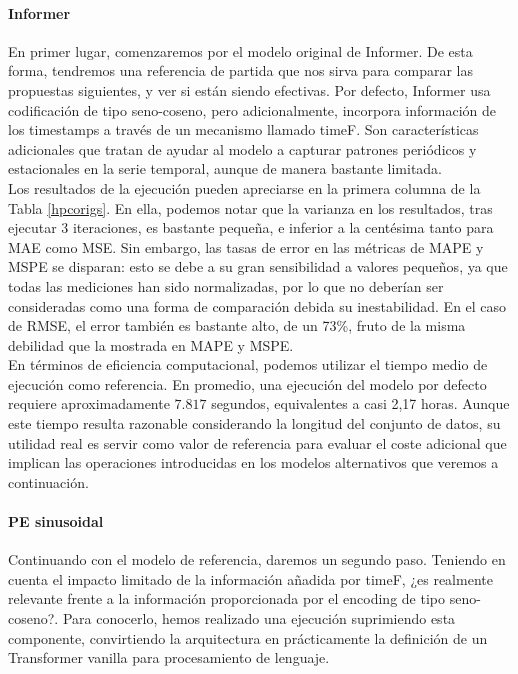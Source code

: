 \paragraph{Informer}

En primer lugar, comenzaremos por el modelo original de Informer. De esta forma, tendremos una referencia de partida que nos sirva para comparar las propuestas siguientes, y ver si están siendo efectivas. Por defecto, Informer usa codificación de tipo seno-coseno, pero adicionalmente, incorpora información de los timestamps a través de un mecanismo llamado timeF. Son características adicionales que tratan de ayudar al modelo a capturar patrones periódicos y estacionales en la serie temporal, aunque de manera bastante limitada.\\

Los resultados de la ejecución pueden apreciarse en la primera columna de la Tabla \ref{hpcorigs}. En ella, podemos notar que la varianza en los resultados, tras ejecutar 3 iteraciones, es bastante pequeña, e inferior a la centésima tanto para MAE como MSE. Sin embargo, las tasas de error en las métricas de MAPE y MSPE se disparan: esto se debe a su gran sensibilidad a valores pequeños, ya que todas las mediciones han sido normalizadas, por lo que no deberían ser consideradas como una forma de comparación debida su inestabilidad. En el caso de RMSE, el error también es bastante alto, de un 73\%, fruto de la misma debilidad que la mostrada en MAPE y MSPE.\\

En términos de eficiencia computacional, podemos utilizar el tiempo medio de ejecución como referencia. En promedio, una ejecución del modelo por defecto requiere aproximadamente $7.817$ segundos, equivalentes a casi 2,17 horas. Aunque este tiempo resulta razonable considerando la longitud del conjunto de datos, su utilidad real es servir como valor de referencia para evaluar el coste adicional que implican las operaciones introducidas en los modelos alternativos que veremos a continuación.

\paragraph{PE sinusoidal}

Continuando con el modelo de referencia, daremos un segundo paso. Teniendo en cuenta el impacto limitado de la información añadida por timeF, ¿es realmente relevante frente a la información proporcionada por el encoding de tipo seno-coseno?. Para conocerlo, hemos realizado una ejecución suprimiendo esta componente, convirtiendo la arquitectura en prácticamente la definición de un Transformer vanilla para procesamiento de lenguaje.\\

